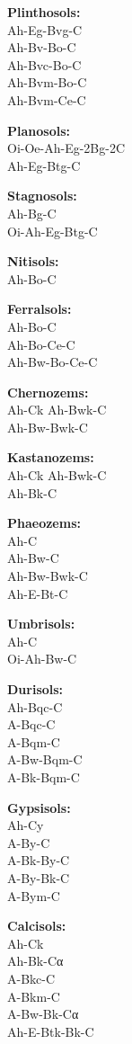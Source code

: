 \documentclass[
  letterpaper,
  DIV=11,
  numbers=noendperiod]{scrreprt}
\begin{document}
\textbf{Plinthosols:}\\
Ah-Eg-Bvg-C\\
Ah-Bv-Bo-C\\
Ah-Bvc-Bo-C\\
Ah-Bvm-Bo-C\\
Ah-Bvm-Ce-C

\textbf{Planosols:}\\
Oi-Oe-Ah-Eg-2Bg-2C\\
Ah-Eg-Btg-C

\textbf{Stagnosols:}\\
Ah-Bg-C\\
Oi-Ah-Eg-Btg-C

\textbf{Nitisols:}\\
Ah-Bo-C

\textbf{Ferralsols:}\\
Ah-Bo-C\\
Ah-Bo-Ce-C\\
Ah-Bw-Bo-Ce-C

\textbf{Chernozems:}\\
Ah-Ck Ah-Bwk-C\\
Ah-Bw-Bwk-C

\textbf{Kastanozems:}\\
Ah-Ck Ah-Bwk-C\\
Ah-Bk-C

\textbf{Phaeozems:}\\
Ah-C\\
Ah-Bw-C\\
Ah-Bw-Bwk-C\\
Ah-E-Bt-C

\textbf{Umbrisols:}\\
Ah-C\\
Oi-Ah-Bw-C

\textbf{Durisols:}\\
Ah-Bqc-C\\
A-Bqc-C\\
A-Bqm-C\\
A-Bw-Bqm-C\\
A-Bk-Bqm-C

\textbf{Gypsisols:}\\
Ah-Cy\\
A-By-C\\
A-Bk-By-C\\
A-By-Bk-C\\
A-Bym-C

\textbf{Calcisols:}\\
Ah-Ck\\
Ah-Bk-Cα\\
A-Bkc-C\\
A-Bkm-C\\
A-Bw-Bk-Cα\\
Ah-E-Btk-Bk-C
\end{document}
